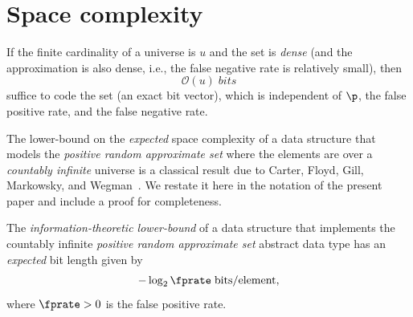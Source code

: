 \section{Space complexity}
\label{sec:space_comp}

If the finite cardinality of a universe is $u$ and the set is \emph{dense} (and the approximation is also dense, i.e., the false negative rate is relatively
small), then
\begin{equation}
    \mathcal{O}(u) \; \si{bits}
\end{equation}
suffice to code the set (an exact bit vector), which is independent of $\p$, the false positive rate, and the false negative rate.

The lower-bound on the \emph{expected} space complexity of a data structure that models the \emph{positive random approximate set} where the elements are over a \emph{countably infinite} universe is a classical result due to Carter, Floyd, Gill, Markowsky, and Wegman~\cite{carterExact}.
We restate it here in the notation of the present paper and include a proof for completeness.
\begin{proposition}
\label{pst:approx_l_b}
The \emph{information-theoretic lower-bound} of a data structure that implements the countably infinite \emph{positive random approximate set} abstract data type has an \emph{expected} bit length given by
\begin{equation}
    -\log_2 \fprate \; \si{bits \per element},
\end{equation}
where $\fprate > 0$ is the false positive rate.
\end{proposition}
